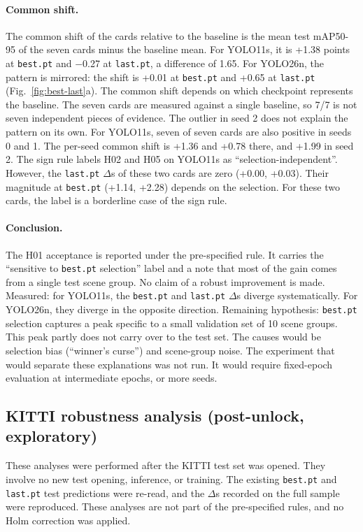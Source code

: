 \paragraph{Common shift.}
The common shift of the cards relative to the baseline is the mean test mAP50-95 of the seven cards minus the baseline mean. For YOLO11s, it is +1.38 points at \texttt{best.pt} and $-$0.27 at \texttt{last.pt}, a difference of 1.65. For YOLO26n, the pattern is mirrored: the shift is +0.01 at \texttt{best.pt} and +0.65 at \texttt{last.pt} (Fig.~\ref{fig:best-last}a). The common shift depends on which checkpoint represents the baseline. The seven cards are measured against a single baseline, so 7/7 is not seven independent pieces of evidence. The outlier in seed 2 does not explain the pattern on its own. For YOLO11s, seven of seven cards are also positive in seeds 0 and 1. The per-seed common shift is +1.36 and +0.78 there, and +1.99 in seed 2. The sign rule labels H02 and H05 on YOLO11s as ``selection-independent''. However, the \texttt{last.pt} $\Delta$s of these two cards are zero (+0.00, +0.03). Their magnitude at \texttt{best.pt} (+1.14, +2.28) depends on the selection. For these two cards, the label is a borderline case of the sign rule.

\paragraph{Conclusion.}
The H01 acceptance is reported under the pre-specified rule. It carries the ``sensitive to \texttt{best.pt} selection'' label and a note that most of the gain comes from a single test scene group. No claim of a robust improvement is made. Measured: for YOLO11s, the \texttt{best.pt} and \texttt{last.pt} $\Delta$s diverge systematically. For YOLO26n, they diverge in the opposite direction. Remaining hypothesis: \texttt{best.pt} selection captures a peak specific to a small validation set of 10 scene groups. This peak partly does not carry over to the test set. The causes would be selection bias (``winner's curse'') and scene-group noise. The experiment that would separate these explanations was not run. It would require fixed-epoch evaluation at intermediate epochs, or more seeds.

\FloatBarrier
\subsection{KITTI robustness analysis (post-unlock, exploratory)}\label{sec:ek-saglamlik}
These analyses were performed after the KITTI test set was opened. They involve no new test opening, inference, or training. The existing \texttt{best.pt} and \texttt{last.pt} test predictions were re-read, and the $\Delta$s recorded on the full sample were reproduced. These analyses are not part of the pre-specified rules, and no Holm correction was applied.


